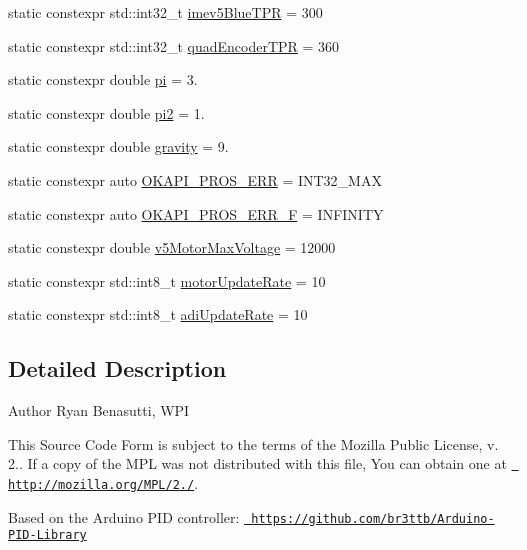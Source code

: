 \begin{DoxyCompactItemize}
\item 
static constexpr std\+::int32\+\_\+t \mbox{\hyperlink{namespaceokapi_a8d9e012d255d1fc2154c0dd9345d61ae}{imev5\+Blue\+T\+PR}} = 300
\item 
static constexpr std\+::int32\+\_\+t \mbox{\hyperlink{namespaceokapi_ad45ebef87cdaccd36ca4234d0bfdeee3}{quad\+Encoder\+T\+PR}} = 360
\item 
static constexpr double \mbox{\hyperlink{namespaceokapi_a3456eff6b02ec38b7771c227250f101c}{pi}} = 3.
\item 
static constexpr double \mbox{\hyperlink{namespaceokapi_a0f3c3909136daa4ae9532361a870a213}{pi2}} = 1.
\item 
static constexpr double \mbox{\hyperlink{namespaceokapi_a35009d9782cfcf5a519ff7d8fc39f86f}{gravity}} = 9.
\item 
static constexpr auto \mbox{\hyperlink{namespaceokapi_a18913fb1230fd1353366981f1f78335c}{O\+K\+A\+P\+I\+\_\+\+P\+R\+O\+S\+\_\+\+E\+RR}} = I\+N\+T32\+\_\+\+M\+AX
\item 
static constexpr auto \mbox{\hyperlink{namespaceokapi_a0f2b0da948b0276b354ca035af11380e}{O\+K\+A\+P\+I\+\_\+\+P\+R\+O\+S\+\_\+\+E\+R\+R\+\_\+F}} = I\+N\+F\+I\+N\+I\+TY
\item 
static constexpr double \mbox{\hyperlink{namespaceokapi_a4507bf58013826d1597fd5e548175612}{v5\+Motor\+Max\+Voltage}} = 12000
\item 
static constexpr std\+::int8\+\_\+t \mbox{\hyperlink{namespaceokapi_af6ac90c5f9ae02ffb17466bafcfbec4c}{motor\+Update\+Rate}} = 10
\item 
static constexpr std\+::int8\+\_\+t \mbox{\hyperlink{namespaceokapi_abf765c88ac34df87d378fb66ea5fd20c}{adi\+Update\+Rate}} = 10
\end{DoxyCompactItemize}


\subsection{Detailed Description}
\begin{DoxyAuthor}{Author}
Ryan Benasutti, W\+PI
\end{DoxyAuthor}
This Source Code Form is subject to the terms of the Mozilla Public License, v. 2.. If a copy of the M\+PL was not distributed with this file, You can obtain one at \href{http://mozilla.org/MPL/2.0/}{\texttt{ http\+://mozilla.\+org/\+M\+P\+L/2./}}.

Based on the Arduino P\+ID controller\+: \href{https://github.com/br3ttb/Arduino-PID-Library}{\texttt{ https\+://github.\+com/br3ttb/\+Arduino-\/\+P\+I\+D-\/\+Library}}


